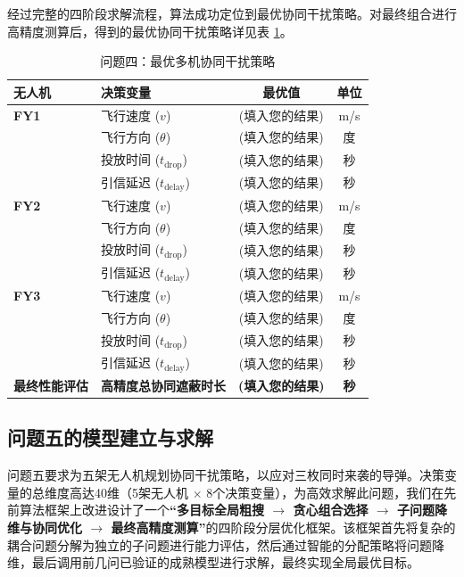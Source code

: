 \documentclass[12pt]{article}
\begin{document}
\begin{CJK}{UTF8}{gbsn}
		经过完整的四阶段求解流程，算法成功定位到最优协同干扰策略。对最终组合进行高精度测算后，得到的最优协同干扰策略详见表 \ref{tab:q4_results}。
		
		\begin{table}[H]
			\centering
			\caption{问题四：最优多机协同干扰策略}
			\label{tab:q4_results}
				\begin{tabular}{@{}llcc@{}}
					\toprule
					\textbf{无人机} & \textbf{决策变量} & \textbf{最优值} & \textbf{单位} \\
					\midrule
					\textbf{FY1} & 飞行速度 ($v$) & (填入您的结果) & m/s \\
					& 飞行方向 ($\theta$) & (填入您的结果) & 度 \\
					& 投放时间 ($t_{\text{drop}}$) & (填入您的结果) & 秒 \\
					& 引信延迟 ($t_{\text{delay}}$) & (填入您的结果) & 秒 \\
					\midrule
					\textbf{FY2} & 飞行速度 ($v$) & (填入您的结果) & m/s \\
					& 飞行方向 ($\theta$) & (填入您的结果) & 度 \\
					& 投放时间 ($t_{\text{drop}}$) & (填入您的结果) & 秒 \\
					& 引信延迟 ($t_{\text{delay}}$) & (填入您的结果) & 秒 \\
					\midrule
					\textbf{FY3} & 飞行速度 ($v$) & (填入您的结果) & m/s \\
					& 飞行方向 ($\theta$) & (填入您的结果) & 度 \\
					& 投放时间 ($t_{\text{drop}}$) & (填入您的结果) & 秒 \\
					& 引信延迟 ($t_{\text{delay}}$) & (填入您的结果) & 秒 \\
					\midrule
					\textbf{最终性能评估} & \textbf{高精度总协同遮蔽时长} & \textbf{(填入您的结果)} & \textbf{秒} \\
					\bottomrule
			\end{tabular}
		\end{table}
		
		\subsection{问题五的模型建立与求解}
		问题五要求为五架无人机规划协同干扰策略，以应对三枚同时来袭的导弹。决策变量的总维度高达40维（5架无人机 × 8个决策变量），为高效求解此问题，我们在先前算法框架上改进设计了一个\textbf{“多目标全局粗搜 $\rightarrow$ 贪心组合选择 $\rightarrow$ 子问题降维与协同优化 $\rightarrow$ 最终高精度测算”}的四阶段分层优化框架。该框架首先将复杂的耦合问题分解为独立的子问题进行能力评估，然后通过智能的分配策略将问题降维，最后调用前几问已验证的成熟模型进行求解，最终实现全局最优目标。
		

\end{CJK}
\end{document}

